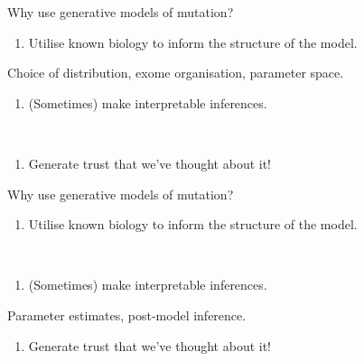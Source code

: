 \documentclass{beamer}
\begin{document}
\begin{frame}{Why use generative models of mutation?}

\begin{enumerate}[I]
    \item Utilise known biology to inform the structure of the model.
\end{enumerate}
\indent \color{red} Choice of distribution, exome organisation, parameter space.\color{black}
\begin{enumerate}[II]
    \item (Sometimes) make interpretable inferences.
\end{enumerate}
~\\
\begin{enumerate}[III]    
    \item Generate trust that we've thought about it!  
\end{enumerate}
\end{frame}

\begin{frame}{Why use generative models of mutation?}
\begin{enumerate}[I]
    \item Utilise known biology to inform the structure of the model.
\end{enumerate}
~\\
\begin{enumerate}[II]
    \item (Sometimes) make interpretable inferences.
\end{enumerate}
\indent \color{red} Parameter estimates, post-model inference.\color{black}
\begin{enumerate}[III]    
    \item Generate trust that we've thought about it!  
\end{enumerate}
\end{frame}
\end{document}

